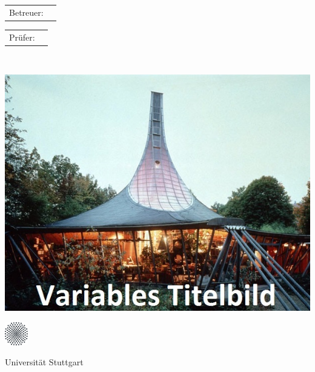 \begin{titlepage}
\begin{minipage}[c]{105mm}
		\vspace{5mm}
		\hspace{-3.0mm} 
		\begin{tabular}{p{2.5cm}l}
			\fontsize{12}{20}\textsf{Betreuer:}&\textsf{\betreuer} \\ 
		\end{tabular}
		
		\vspace{5mm}
		\hspace{-3.0mm} 
		\begin{tabular}{p{2.5cm}l}
			\fontsize{12}{20}\textsf{Prüfer:}&\textsf{\pruefer}	\\
		\end{tabular}
		
		\vspace{11mm}
		\fontsize{12}{20}\textsf{\EndeMonatTxt~\EndeJahr}
		
		
		\begin{minipage}[t][10.5cm][c]{\textwidth}
			\includegraphics[width=1.0\textwidth]{Titelbild.jpg}
		\end{minipage}
		
		
		\begin{minipage}[c]{12mm}
			\vspace{-1mm}
			\includegraphics[width=10mm]{unistuttgart_logo_de.jpg}
		\end{minipage}
		\begin{minipage}[c]{60mm}
			\fontsize{12}{20}\textsf{Universität Stuttgart}
		\end{minipage}
		
		\fontsize{12}{20}
		\vspace{3mm}
		\textsf{\institut} \\
		\textsf{\profEins} \\
		\textsf{\profZwei} \\
		\textsf{\profDrei} 
		
	\end{minipage}
	\cleardoublepage
\end{titlepage}
